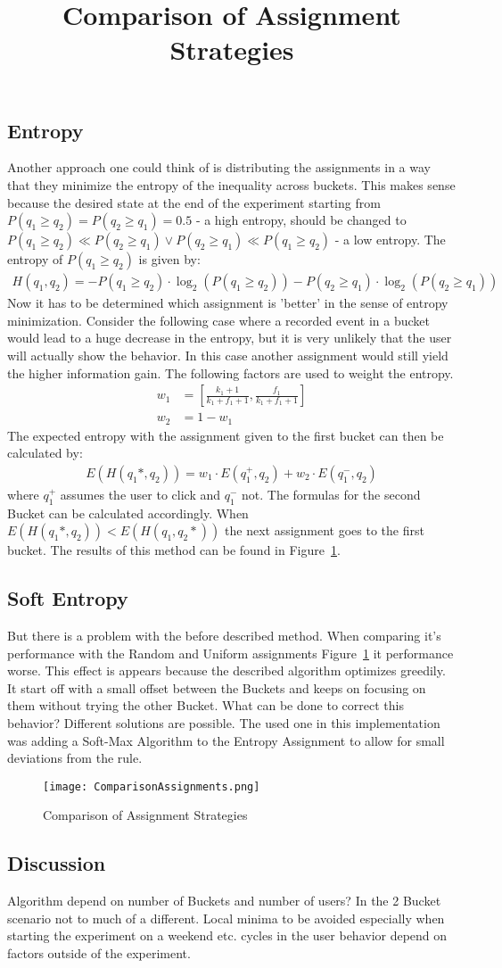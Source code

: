 \documentclass[../Thesis.tex]{subfiles}
\begin{document}
\subsection{Entropy}
Another approach one could think of is distributing the assignments in a way that they minimize the entropy of the inequality across buckets. This makes sense because the desired state at the end of the experiment starting from $P(q_1\geq q_2)=P(q_2\geq q_1)=0.5$ - a high entropy, should be changed to $P(q_1\geq q_2)\ll P(q_2\geq q_1) \lor P(q_2\geq q_1)\ll P(q_1\geq q_2)$ - a low entropy. The entropy of $P(q_1\geq q_2)$ is given by:
\begin{align*}
H(q_1,q_2) 	= - P(q_1\geq q_2) \cdot \log_2(P(q_1\geq q_2)) - P(q_2\geq q_1) \cdot \log_2(P(q_2\geq q_1))
\end{align*}
Now it has to be determined which assignment is 'better' in the sense of entropy minimization. Consider the following case where a recorded event in a bucket would lead to a huge decrease in the entropy, but it is very unlikely that the user will actually show the behavior. In this case another assignment would still yield the higher information gain. The following factors are used to weight the entropy.
\begin{align*}
w_1 &=[\frac{k_1+1}{k_1+f_1+1},\frac{f_1}{k_1+f_1+1}] \\
w_2 &=1 - w_1
\end{align*}
The expected entropy with the assignment given to the first bucket can then be calculated by:
\begin{align*}
E(H(q_1*,q_2)) = w_1\cdot E(q_1^+,q_2) + w_2\cdot E(q_1^-,q_2)
\end{align*}
where $q_1^+$ assumes the user to click and $q_1^-$ not. The formulas for the second Bucket can be calculated accordingly. When $E(H(q_1*,q_2)) < E(H(q_1,q_2*))$ the next assignment goes to the first bucket. The results of this method can be found in Figure~\ref{fig:AssignmentComp}.

\subsection{Soft Entropy}
But there is a problem with the before described method. When comparing it's performance with the Random and Uniform assignments Figure~\ref{fig:AssignmentComp} it performance worse. This effect is appears because the described algorithm optimizes greedily. It start off with a small offset between the Buckets and keeps on focusing on them without trying the other Bucket. What can be done to correct this behavior? Different solutions are possible. The used one in this implementation was adding a Soft-Max Algorithm to the Entropy Assignment to allow for small deviations from the rule.
\begin{figure}[ht]
\hfuzz=10cm
\texttt{[image: ComparisonAssignments.png]}
\centering
\title{Comparison of Assignment Strategies}
\caption{Comparison of Assignment Strategies}
\label{fig:AssignmentComp}
\end{figure}
\subsection{Discussion}
Algorithm depend on number of Buckets and number of users? In the 2 Bucket scenario not to much of a different. Local minima to be avoided especially when starting the experiment on a weekend etc. cycles in the user behavior depend on factors outside of the experiment.
\end{document}
